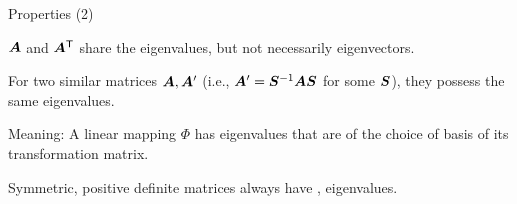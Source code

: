 \documentclass[handout,fleqn,aspectratio=169]{beamer}
\begin{document}
\begin{frame}{Properties (2)}

\plitemsep 0.2in

\bci
\item $\bm{A}$ and ${\bm{A}}^{\mathsf{T}}$ share the eigenvalues, but not necessarily eigenvectors. 

\item For two similar matrices $\bm{A},\bm{A}'$ (i.e., $\bm{A}' = {{\bm{S}}^{-1}}\bm{A} \bm{S}$ for some $\bm{S}$), they possess the same eigenvalues. 

\bci
\item Meaning: A linear mapping $\Phi$ has eigenvalues that are  of the choice of basis of its transformation matrix. 


\item Symmetric, positive definite matrices always have ,  eigenvalues.
\eci
\eci



\end{frame}
\end{document}
